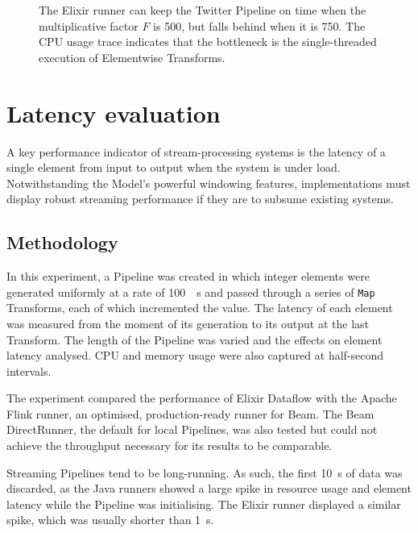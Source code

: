 \begin{figure}
{		\label{fig:eval:twitter:throughput:750}
	}
	\caption[Watermark and CPU traces of the Elixir runner executing the Twitter Pipeline at two different values of the multiplicative factor.]{The Elixir runner can keep the Twitter Pipeline on time when the multiplicative factor $F$ is \num{500}, but falls behind when it is \num{750}. The CPU usage trace indicates that the bottleneck is the single-threaded execution of Elementwise Transforms.}
	\label{fig:eval:twitter:throughput}
\end{figure}


\section{Latency evaluation}\label{sec:eval:latency}

A key performance indicator of stream-processing systems is the latency of a single element from input to output when the system is under load.
Notwithstanding the Model's powerful windowing features, implementations must display robust streaming performance if they are to subsume existing systems.

\subsection{Methodology}


In this experiment, a Pipeline was created in which integer elements were generated uniformly at a rate of \SI{100}{\per\second} and passed through a series of \verb|Map| Transforms, each of which incremented the value.
The latency of each element was measured from the moment of its generation to its output at the last Transform.
The length of the Pipeline was varied and the effects on element latency analysed.
CPU and memory usage were also captured at half-second intervals.

The experiment compared the performance of Elixir Dataflow with the Apache Flink runner, an optimised, production-ready runner for Beam.
The Beam DirectRunner, the default for local Pipelines, was also tested but could not achieve the throughput necessary for its results to be comparable.

Streaming Pipelines tend to be long-running. As such, the first \SI{10}{\second} of data was discarded, as the Java runners showed a large spike in resource usage and element latency while the Pipeline was initialising.
The Elixir runner displayed a similar spike, which was usually shorter than \SI{1}{\second}.

